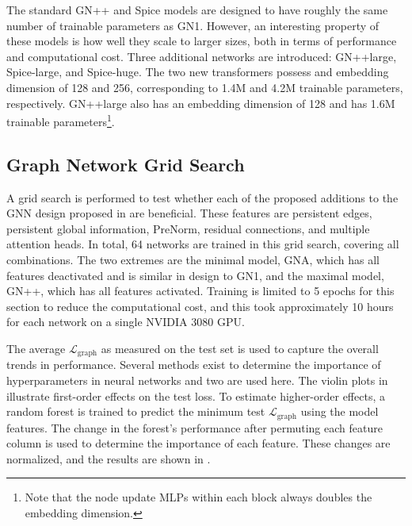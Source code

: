 The standard \Gls{GN++} and Spice models are designed to have roughly the same number of trainable parameters as \Gls{GN1}.
However, an interesting property of these models is how well they scale to larger sizes, both in terms of performance and computational cost.
Three additional networks are introduced: \Gls{GN++}large, Spice-large, and Spice-huge.
The two new transformers possess and embedding dimension of 128 and 256, corresponding to 1.4M and 4.2M trainable parameters, respectively.
\Gls{GN++}large also has an embedding dimension of 128 and has 1.6M trainable parameters\footnote{Note that the node update MLPs within each block always doubles the embedding dimension.}.

\subsection{Graph Network Grid Search}

A grid search is performed to test whether each of the proposed additions to the GNN design proposed in  are beneficial.
These features are persistent edges, persistent global information, PreNorm, residual connections, and multiple attention heads.
In total, 64 networks are trained in this grid search, covering all combinations.
The two extremes are the minimal model, GNA, which has all features deactivated and is similar in design to \Gls{GN1}, and the maximal model, \Gls{GN++}, which has all features activated.
Training is limited to 5 epochs for this section to reduce the computational cost, and this took approximately 10 hours for each network on a single NVIDIA 3080 GPU\@.

The average $\mathcal{L}_{\text{graph}}$ as measured on the test set is used to capture the overall trends in performance.
Several methods exist to determine the importance of hyperparameters in neural networks and two are used here.
The violin plots in  illustrate first-order effects on the test loss.
To estimate higher-order effects, a random forest is trained to predict the minimum test $\mathcal{L}_{\text{graph}}$ using the model features.
The change in the forest's performance after permuting each feature column is used to determine the importance of each feature.
These changes are normalized, and the results are shown in .


